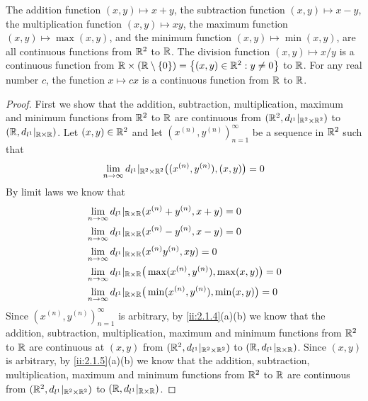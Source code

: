 \begin{lem}\label{ii:2.2.2}
  The addition function \((x, y) \mapsto x + y\), the subtraction function \((x, y) \mapsto x - y\), the multiplication function \((x, y) \mapsto xy\), the maximum function \((x, y) \mapsto \max(x, y)\), and the minimum function \((x, y) \mapsto \min(x, y)\), are all continuous functions from \(\mathbb{R}^2\) to \(\mathbb{R}\).
  The division function \((x, y) \mapsto x / y\) is a continuous function from \(\mathbb{R} \times (\mathbb{R} \setminus \left\lbrace0\right\rbrace) = \left\lbrace(x, y) \in \mathbb{R}^2 : y \neq 0\right\rbrace\) to \(\mathbb{R}\).
  For any real number \(c\), the function \(x \mapsto cx\) is a continuous function from \(\mathbb{R}\) to \(\mathbb{R}\).
\end{lem}

\begin{proof}
  First we show that the addition, subtraction, multiplication, maximum and minimum functions from \(\mathbb{R}^2\) to \(\mathbb{R}\) are continuous from \((\mathbb{R}^2, d_{l^1}|_{\mathbb{R}^2 \times \mathbb{R}^2})\) to \((\mathbb{R}, d_{l^1}|_{\mathbb{R} \times \mathbb{R}})\).
  Let \((x, y) \in \mathbb{R}^2\) and let \((x^{(n)}, y^{(n)})_{n = 1}^\infty\) be a sequence in \(\mathbb{R}^2\) such that
  \[
    \lim_{n \to \infty} d_{l^1}|_{\mathbb{R}^2 \times \mathbb{R}^2}\big((x^{(n)}, y^{(n)}), (x, y)\big) = 0
  \]
  By limit laws we know that
  \begin{align*}
     & \lim_{n \to \infty} d_{l^1}|_{\mathbb{R} \times \mathbb{R}}(x^{(n)} + y^{(n)}, x + y) = 0                   \\
     & \lim_{n \to \infty} d_{l^1}|_{\mathbb{R} \times \mathbb{R}}(x^{(n)} - y^{(n)}, x - y) = 0                   \\
     & \lim_{n \to \infty} d_{l^1}|_{\mathbb{R} \times \mathbb{R}}(x^{(n)} y^{(n)}, xy) = 0                        \\
     & \lim_{n \to \infty} d_{l^1}|_{\mathbb{R} \times \mathbb{R}}\big(\max(x^{(n)}, y^{(n)}), \max(x, y)\big) = 0 \\
     & \lim_{n \to \infty} d_{l^1}|_{\mathbb{R} \times \mathbb{R}}\big(\min(x^{(n)}, y^{(n)}), \min(x, y)\big) = 0 \\
  \end{align*}
  Since \((x^{(n)}, y^{(n)})_{n = 1}^\infty\) is arbitrary, by \cref{ii:2.1.4}(a)(b) we know that the addition, subtraction, multiplication, maximum and minimum functions from \(\mathbb{R}^2\) to \(\mathbb{R}\) are continuous at \((x, y)\) from \((\mathbb{R}^2, d_{l^1}|_{\mathbb{R}^2 \times \mathbb{R}^2})\) to \((\mathbb{R}, d_{l^1}|_{\mathbb{R} \times \mathbb{R}})\).
  Since \((x, y)\) is arbitrary, by \cref{ii:2.1.5}(a)(b) we know that the addition, subtraction, multiplication, maximum and minimum functions from \(\mathbb{R}^2\) to \(\mathbb{R}\) are continuous from \((\mathbb{R}^2, d_{l^1}|_{\mathbb{R}^2 \times \mathbb{R}^2})\) to \((\mathbb{R}, d_{l^1}|_{\mathbb{R} \times \mathbb{R}})\).


\end{proof}
